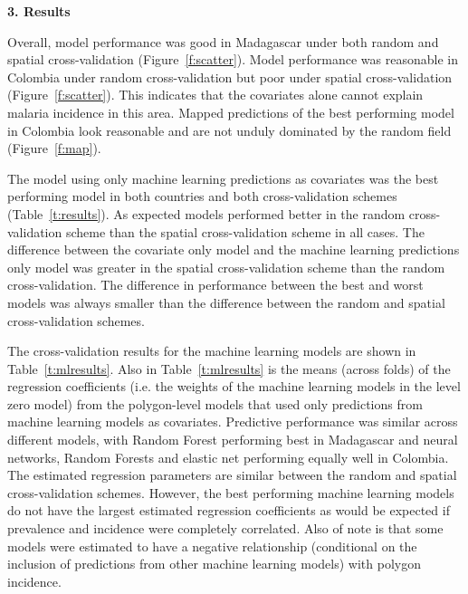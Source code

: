 \documentclass[11pt]{article}
\begin{document}
{\bf 3. Results}

Overall, model performance was good in Madagascar under both random and spatial cross-validation (Figure~\ref{f:scatter}).
Model performance was reasonable in Colombia under random cross-validation but poor under spatial cross-validation (Figure~\ref{f:scatter}).
This indicates that the covariates alone cannot explain malaria incidence in this area.
Mapped predictions of the best performing model in Colombia look reasonable and are not unduly dominated by the random field (Figure~\ref{f:map}).

The model using only machine learning predictions as covariates was the best performing model in both countries and both cross-validation schemes (Table~\ref{t:results}).
As expected models performed better in the random cross-validation scheme than the spatial cross-validation scheme in all cases.
The difference between the covariate only model and the machine learning predictions only model was greater in the spatial cross-validation scheme than the random cross-validation.
The difference in performance between the best and worst models was always smaller than the difference between the random and spatial cross-validation schemes.

The cross-validation results for the machine learning models are shown in Table~\ref{t:mlresults}.
Also in Table~\ref{t:mlresults} is the means (across folds) of the  regression coefficients (i.e. the weights of the machine learning models in the level zero model) from the polygon-level models that used only predictions from machine learning models as covariates.
Predictive performance was similar across different models, with Random Forest performing best in Madagascar and neural networks, Random Forests and elastic net performing equally well in Colombia.
The estimated regression parameters are similar between the random and spatial cross-validation schemes.
However, the best performing machine learning models do not have the largest estimated regression coefficients as would be expected if prevalence and incidence were completely correlated.
Also of note is that some models were estimated to have a negative relationship (conditional on the inclusion of predictions from other machine learning models) with polygon incidence.

%
\end{document}
